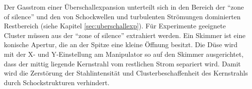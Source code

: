Der Gasstrom einer Überschallexpansion unterteilt sich in den Bereich der \enquote{zone of silence} und den von Schockwellen und turbulenten Strömungen dominierten Restbereich (siehe Kapitel \ref{sec:uberschallexp}). Für Experimente geeignete Cluster müssen aus der \enquote{zone of silence} extrahiert werden. Ein Skimmer ist eine konische Apertur, die an der Spitze eine kleine Öffnung besitzt. Die Düse wird mit der X- und Y-Einstellung am Manipulator so auf den Skimmer ausgerichtet, dass der mittig liegende Kernstrahl vom restlichen Strom separiert wird. Damit wird die Zerstörung der Stahlintensität und Clusterbeschaffenheit des Kernstrahls durch Schockstrukturen verhindert. 

